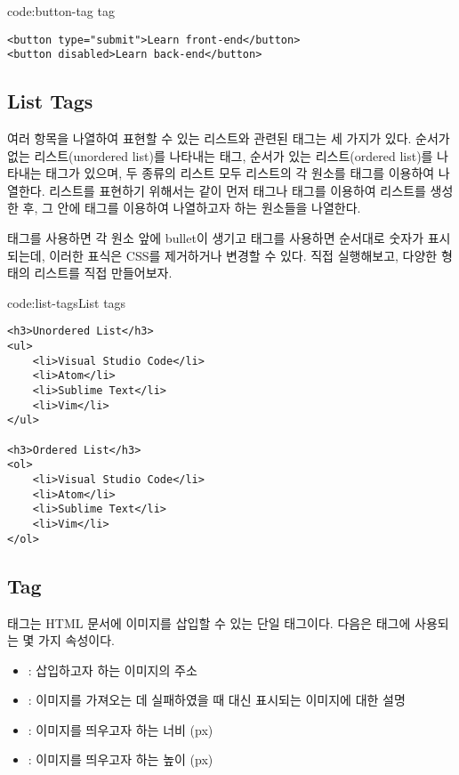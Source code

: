 \begin{code}{code:button-tag}{ tag}
\begin{verbatim}
<button type="submit">Learn front-end</button>
<button disabled>Learn back-end</button>
\end{verbatim}
\end{code}

\subsection*{List Tags}
여러 항목을 나열하여 표현할 수 있는 리스트와 관련된 태그는 세 가지가 있다. 순서가 없는 리스트(unordered list)를 나타내는  태그, 순서가 있는 리스트(ordered list)를 나타내는  태그가 있으며, 두 종류의 리스트 모두 리스트의 각 원소를  태그를 이용하여 나열한다. 리스트를 표현하기 위해서는 \와 같이 먼저  태그나  태그를 이용하여 리스트를 생성한 후, 그 안에  태그를 이용하여 나열하고자 하는 원소들을 나열한다.

 태그를 사용하면 각 원소 앞에 bullet이 생기고  태그를 사용하면 순서대로 숫자가 표시되는데, 이러한 표식은 CSS를 제거하거나 변경할 수 있다. \를 직접 실행해보고, 다양한 형태의 리스트를 직접 만들어보자.

\begin{code}{code:list-tags}{List tags}
\begin{verbatim}
<h3>Unordered List</h3>
<ul>
    <li>Visual Studio Code</li>
    <li>Atom</li>
    <li>Sublime Text</li>
    <li>Vim</li>
</ul>

<h3>Ordered List</h3>
<ol>
    <li>Visual Studio Code</li>
    <li>Atom</li>
    <li>Sublime Text</li>
    <li>Vim</li>
</ol>
\end{verbatim}
\end{code}

\subsection*{ Tag}
 태그는 HTML 문서에 이미지를 삽입할 수 있는 단일 태그이다. 다음은  태그에 사용되는 몇 가지 속성이다.

\begin{itemize}
    \item {}: 삽입하고자 하는 이미지의 주소
    \item {}: 이미지를 가져오는 데 실패하였을 때 대신 표시되는 이미지에 대한 설명
    \item {}: 이미지를 띄우고자 하는 너비 (px)
    \item {}: 이미지를 띄우고자 하는 높이 (px)
\end{itemize}

